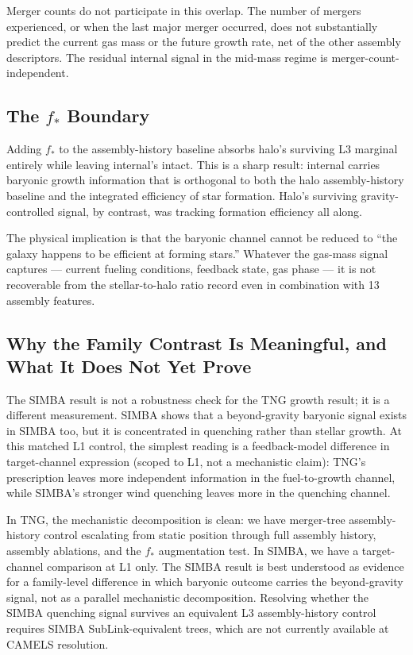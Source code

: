 \documentclass[twocolumn,linenumbers]{aastex701}
\newcommand{\fstar}{f_*}
\begin{document}
Merger counts do not participate in this overlap.
The number of mergers experienced, or when the last major merger occurred,
does not substantially predict the current gas mass or the future growth
rate, net of the other assembly descriptors.
The residual internal signal in the mid-mass regime is
merger-count-independent.

\subsection{The $\fstar$ Boundary}

Adding $\fstar$ to the assembly-history baseline absorbs halo's surviving
L3 marginal entirely while leaving internal's intact.
This is a sharp result: internal carries baryonic growth information that is
orthogonal to both the halo assembly-history baseline and the integrated
efficiency of star formation.
Halo's surviving gravity-controlled signal, by contrast, was tracking
formation efficiency all along.

The physical implication is that the baryonic channel cannot be reduced to
``the galaxy happens to be efficient at forming stars.''
Whatever the gas-mass signal captures --- current fueling conditions,
feedback state, gas phase --- it is not recoverable from the
stellar-to-halo ratio record even in combination with 13 assembly features.

\subsection{Why the Family Contrast Is Meaningful, and What It Does Not Yet Prove}

The SIMBA result is not a robustness check for the TNG growth result; it is
a different measurement.
SIMBA shows that a beyond-gravity baryonic signal exists in SIMBA too, but
it is concentrated in quenching rather than stellar growth.
At this matched L1 control, the simplest reading is a feedback-model difference
in target-channel expression (scoped to L1, not a mechanistic claim): TNG's
prescription leaves more independent information in the fuel-to-growth channel,
while SIMBA's stronger wind quenching leaves more in the quenching channel.

In TNG, the mechanistic decomposition is clean: we have merger-tree
assembly-history control escalating from static position through full
assembly history, assembly ablations, and the $\fstar$ augmentation test.
In SIMBA, we have a target-channel comparison at L1 only.
The SIMBA result is best understood as evidence for a family-level
difference in which baryonic outcome carries the beyond-gravity signal, not
as a parallel mechanistic decomposition.
Resolving whether the SIMBA quenching signal survives an equivalent L3
assembly-history control requires SIMBA SubLink-equivalent trees, which are
not currently available at CAMELS resolution.
\end{document}
